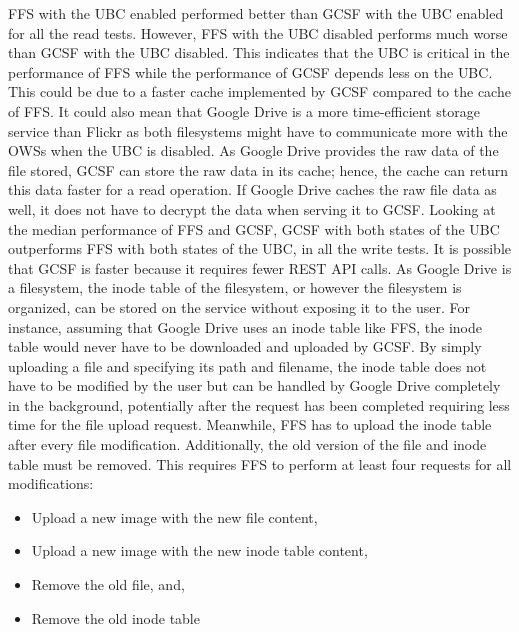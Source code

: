 \gls{FFS} with the \gls{UBC} enabled performed better than \gls{GCSF} with the \gls{UBC} enabled for all the read tests. However, \gls{FFS} with the \gls{UBC} disabled performs much worse than \gls{GCSF} with the \gls{UBC} disabled. This indicates that the \gls{UBC} is critical in the performance of \gls{FFS} while the performance of \gls{GCSF} depends less on the \gls{UBC}. This could be due to a faster cache implemented by \gls{GCSF} compared to the cache of \gls{FFS}. It could also mean that Google Drive is a more \mbox{time-efficient} storage service than Flickr as both filesystems might have to communicate more with the \glspl{OWS} when the \gls{UBC} is disabled. As Google Drive provides the raw data of the file stored, \gls{GCSF} can store the raw data in its cache; hence, the cache can return this data faster for a read operation. If Google Drive caches the raw file data as well, it does not have to decrypt the data when serving it to \gls{GCSF}. Looking at the median performance of \gls{FFS} and \gls{GCSF}, \gls{GCSF} with both states of the \gls{UBC} outperforms \gls{FFS} with both states of the \gls{UBC}, in all the write tests. It is possible that \gls{GCSF} is faster because it requires fewer REST \gls{API} calls. As Google Drive is a filesystem, the inode table of the filesystem, or however the filesystem is organized, can be stored on the service without exposing it to the user. For instance, assuming that Google Drive uses an inode table like \gls{FFS}, the inode table would never have to be downloaded and uploaded by \gls{GCSF}. By simply uploading a file and specifying its path and filename, the inode table does not have to be modified by the user but can be handled by Google Drive completely in the background, potentially after the request has been completed requiring less time for the file upload request. Meanwhile, \gls{FFS} has to upload the inode table after every file modification. Additionally, the old version of the file and inode table must be removed. This requires \gls{FFS} to perform at least four requests for all modifications:
\begin{itemize}
	\item Upload a new image with the new file content,
	\item Upload a new image with the new inode table content,
	\item Remove the old file, and,
	\item Remove the old inode table
\end{itemize}
